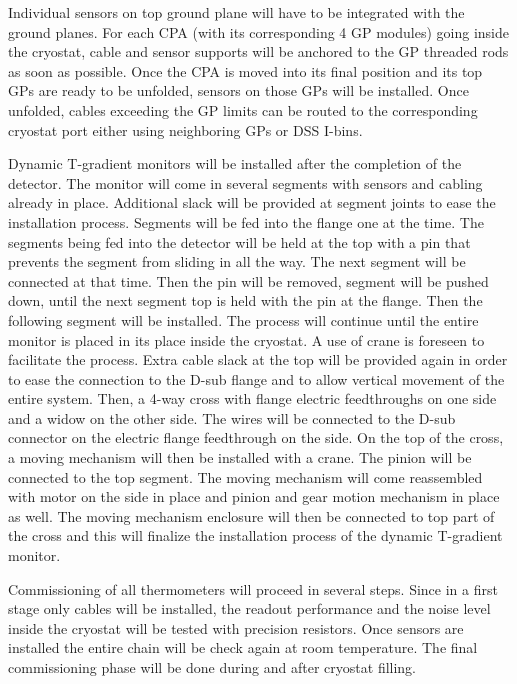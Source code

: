 Individual sensors on top ground plane will have to be integrated with the ground planes. For each CPA (with its corresponding 4 GP modules)
going inside the cryostat, cable and sensor supports will be anchored to the GP threaded rods as soon as possible.
Once the CPA is moved into its final position and its top GPs are ready to be unfolded, sensors on those GPs will be installed. Once unfolded, cables 
exceeding the GP limits can be routed to the corresponding cryostat port either using neighboring GPs or DSS I-bins. 


Dynamic T-gradient monitors will be installed after the completion of the detector.
The monitor will come in several segments with sensors and cabling already
in place. Additional slack will be provided at segment joints to ease the
installation process. Segments will be fed into the flange one at the
time. The segments being fed into the detector will be held at the top
with a pin that prevents the segment from sliding in all the way. The next
segment will be connected at that time. Then the pin will be removed,
segment will be pushed down, until the next segment top is held with the
pin at the flange. Then the following segment will be installed. The
process will continue until the entire monitor is placed in its place
inside the cryostat. A use of crane is foreseen to facilitate the process.
Extra cable slack at the top will be provided again in order to ease  the
connection to the D-sub flange and to allow  vertical movement of the
entire system. Then,  a 4-way cross with flange electric feedthroughs on
one side and a widow on the other side. The wires will  be connected to
the D-sub connector on the electric flange feedthrough on the side. On the
top of the cross, a moving mechanism will then be installed with a crane.
The pinion will be connected to the top segment. The moving mechanism will
come reassembled with motor on the side in place and pinion and gear
motion mechanism in place as well. The moving mechanism enclosure  will
then be connected to top part of the cross and this will finalize the
installation process of the dynamic T-gradient monitor.

Commissioning of all thermometers will proceed in several steps. Since in a first stage only cables will be installed,
the readout performance and the noise level inside the cryostat will be
tested with precision resistors. Once sensors are installed the entire chain will be check again at room temperature.
The final commissioning phase will be done during and after cryostat filling.  


